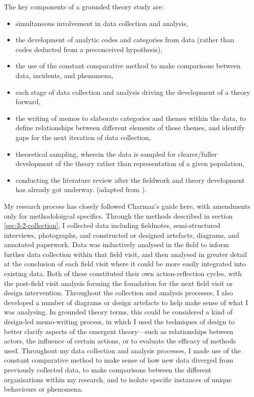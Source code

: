 The key components of a grounded theory study are:
\begin{itemize}
    \item simultaneous involvement in data collection and analysis,
    \item the development of analytic codes and categories from data (rather than codes deducted from a preconceived hypothesis),
    \item the use of the constant comparative method to make comparisons between data, incidents, and phenomena,
    \item each stage of data collection and analysis driving the development of a theory forward,
    \item the writing of memos to elaborate categories and themes within the data, to define relationships between different elements of those themes, and identify gaps for the next iteration of data collection,
    \item theoretical sampling, wherein the data is sampled for clearer/fuller development of the theory rather than representation of a given population,
    \item conducting the literature review after the fieldwork and theory development has already got underway. (adapted from \citet[pp. 5–6]{charmaz_constructing_2006}).
\end{itemize}
 
My research process has closely followed Charmaz's guide here, with amendments only for methodoloigcal specifics. Through the methods described in section \ref{sec:3-2-collection}, I collected data including fieldnotes, semi-structured interviews, photographs, and constructed or designed artefacts, diagrams, and annotated paperwork. Data was inductively analysed in the field to inform further data collection within that field visit, and then analysed in greater detail at the conclusion of each field visit where it could be more easily integrated into existing data. Both of these constituted their own action-reflection cycles, with the post-field visit analysis forming the foundation for the next field visit or design intervention. Throughout the collection and analysis processes, I also developed a number of diagrams or design artefacts to help make sense of what I was analysing. In grounded theory terms, this could be considered a kind of design-led memo-writing process, in which I used the techniques of design to better clarify aspects of the emergent theory—such as relationships between actors, the influence of certain actions, or to evaluate the efficacy of methods used. Throughout my data collection and analysis processes, I made use of the constant comparative method to make sense of how new data diverged from previously collected data, to make comparisons between the different organisations within my research, and to isolate specific instances of unique behaviours or phenomena.

